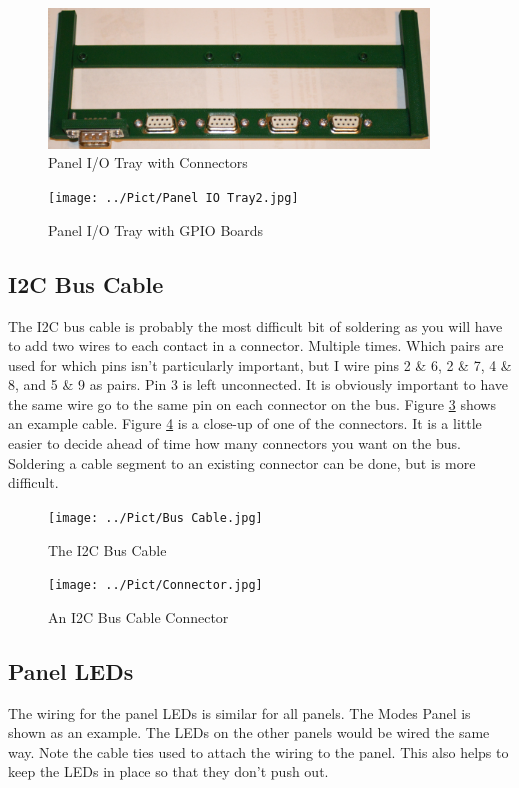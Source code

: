 \documentclass[10pt, openany]{book}
\begin{document}
\begin{figure}[ht!]
  \centering
  \includegraphics[width=0.9\textwidth]{../Pict/Panel IO Tray1.jpg}
  \caption{Panel I/O Tray with Connectors}
  \label{fig:PanelIO1}
\end{figure}

\begin{figure}[ht!]
  \centering
  \texttt{[image: ../Pict/Panel IO Tray2.jpg]}
  \caption{Panel I/O Tray with GPIO Boards}
  \label{fig:PanelIO2}
\end{figure}

\clearpage
\subsection{I2C Bus Cable}
The I2C bus cable is probably the most difficult bit of soldering as you will have to add two wires to each contact in a connector.  Multiple times.  Which pairs are used for which pins isn't particularly important, but I wire pins 2 \& 6, 2 \& 7, 4 \& 8, and 5 \& 9 as pairs.  Pin 3 is left unconnected.  It is obviously important to have the same wire go to the same pin on each connector on the bus.  Figure \ref{fig:Cable1} shows an example cable.  Figure \ref{fig:Cable2} is a close-up of one of the connectors.  It is a little easier to decide ahead of time how many connectors you want on the bus.  Soldering a cable segment to an existing connector can be done, but is more difficult.

\begin{figure}[ht!]
  \centering
  \texttt{[image: ../Pict/Bus Cable.jpg]}
  \caption{The I2C Bus Cable}
  \label{fig:Cable1}
\end{figure}

\begin{figure}[ht!]
  \centering
  \texttt{[image: ../Pict/Connector.jpg]}
  \caption{An I2C Bus Cable Connector}
  \label{fig:Cable2}
\end{figure}

\clearpage
\subsection{Panel LEDs}
The wiring for the panel LEDs is similar for all panels.  The Modes Panel is shown as an example.  The LEDs on the other panels would be wired the same way.  Note the cable ties used to attach the wiring to the panel.  This also helps to keep the LEDs in place so that they don't push out.
\end{document}
